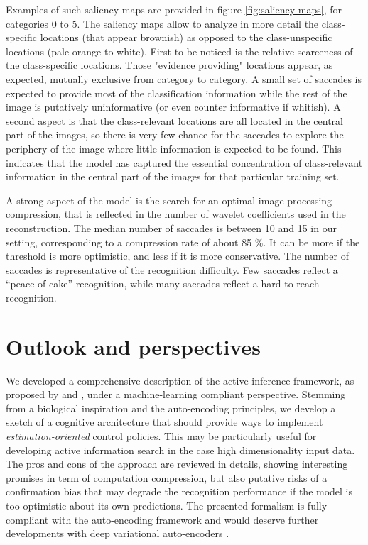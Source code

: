 \documentclass{article} %
\begin{document}
Examples of such saliency maps are provided in figure \ref{fig:saliency-maps}, for categories 0 to 5. The saliency maps allow to analyze in more detail the class-specific locations (that appear brownish) as opposed to the class-unspecific locations (pale orange to white). First to be noticed is the relative scarceness of the class-specific locations. Those "evidence providing" locations appear, as expected, mutually exclusive from category to category. A small set of saccades is expected to provide most of the classification information while the rest of the image is putatively uninformative (or even counter informative if whitish). A second aspect is that the class-relevant locations are all located in the central part of the images, so there is very few chance for the saccades to explore the periphery of the image where little information is expected to be found. This indicates that the model has captured the essential concentration of class-relevant information in the central part of the images for that particular training set.


{\color{blue} A strong aspect of the model is the search for an optimal image processing compression, that is reflected in the number of wavelet coefficients used in the reconstruction. The median number of saccades is between 10 and 15 in our setting, corresponding to a compression rate of about 85 \%. It can be more if the threshold is more optimistic, and less if it is more conservative. The number of saccades is representative of the recognition difficulty. Few saccades reflect a ``peace-of-cake'' recognition, while many saccades reflect a hard-to-reach recognition.  }

\section{Outlook and perspectives}

We developed a comprehensive description of the active inference framework, as proposed by \cite{friston2010free} and \cite{friston2012perceptions}, under a machine-learning compliant perspective. Stemming from a biological inspiration and the auto-encoding principles, we develop a sketch of a cognitive architecture that should provide ways to implement \emph{estimation-oriented} control policies.
This may be particularly useful for developing active information search in the case high dimensionality input data.
The pros and cons of the approach are reviewed in details, showing interesting promises in term of computation compression, but also putative risks of a confirmation bias that may degrade the recognition performance if the model is too optimistic about its own predictions. The presented formalism is fully compliant with the auto-encoding framework and would deserve further developments with deep variational auto-encoders \cite{makhzani2015adversarial}.



\end{document}
